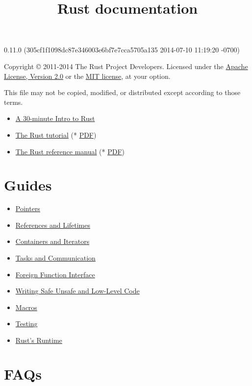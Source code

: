 \documentclass[]{article}
\title{Rust documentation}
\begin{document}
\maketitle

0.11.0 (305cf1f1098dc87e346003e6bf7e7cca5705a135 2014-07-10 11:19:20 -0700)

Copyright © 2011-2014 The Rust Project Developers. Licensed under the
\href{http://www.apache.org/licenses/LICENSE-2.0}{Apache License,
Version 2.0} or the \href{http://opensource.org/licenses/MIT}{MIT
license}, at your option.

This file may not be copied, modified, or distributed except according
to those terms.

{
\hypersetup{linkcolor=black}
\setcounter{tocdepth}{3}
\tableofcontents
}
\begin{itemize}
\itemsep1pt\parskip0pt
\item
  \href{intro.html}{A 30-minute Intro to Rust}
\item
  \href{tutorial.html}{The Rust tutorial} (* \href{tutorial.pdf}{PDF})
\item
  \href{rust.html}{The Rust reference manual} (* \href{rust.pdf}{PDF})
\end{itemize}

\section{Guides}\label{guides}

\begin{itemize}
\itemsep1pt\parskip0pt
\item
  \href{guide-pointers.html}{Pointers}
\item
  \href{guide-lifetimes.html}{References and Lifetimes}
\item
  \href{guide-container.html}{Containers and Iterators}
\item
  \href{guide-tasks.html}{Tasks and Communication}
\item
  \href{guide-ffi.html}{Foreign Function Interface}
\item
  \href{guide-unsafe.html}{Writing Safe Unsafe and Low-Level Code}
\item
  \href{guide-macros.html}{Macros}
\item
  \href{guide-testing.html}{Testing}
\item
  \href{guide-runtime.html}{Rust's Runtime}
\end{itemize}

\section{FAQs}\label{faqs}
\end{document}
